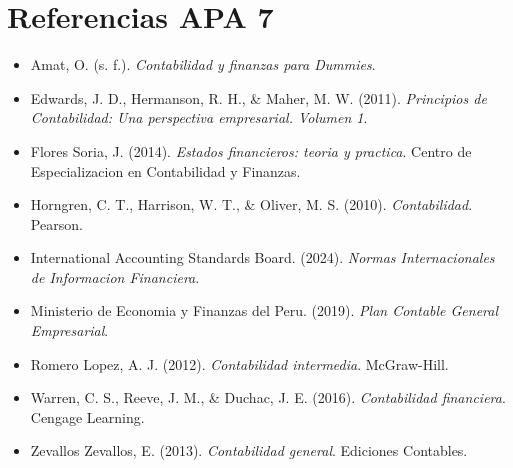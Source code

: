 \section{Referencias APA 7}

\begin{itemize}
  \item Amat, O. (s. f.). \textit{Contabilidad y finanzas para Dummies}.
  \item Edwards, J. D., Hermanson, R. H., \& Maher, M. W. (2011). \textit{Principios de Contabilidad: Una perspectiva empresarial. Volumen 1}.
  \item Flores Soria, J. (2014). \textit{Estados financieros: teoria y practica}. Centro de Especializacion en Contabilidad y Finanzas.
  \item Horngren, C. T., Harrison, W. T., \& Oliver, M. S. (2010). \textit{Contabilidad}. Pearson.
  \item International Accounting Standards Board. (2024). \textit{Normas Internacionales de Informacion Financiera}.
  \item Ministerio de Economia y Finanzas del Peru. (2019). \textit{Plan Contable General Empresarial}.
  \item Romero Lopez, A. J. (2012). \textit{Contabilidad intermedia}. McGraw-Hill.
  \item Warren, C. S., Reeve, J. M., \& Duchac, J. E. (2016). \textit{Contabilidad financiera}. Cengage Learning.
  \item Zevallos Zevallos, E. (2013). \textit{Contabilidad general}. Ediciones Contables.
\end{itemize}
